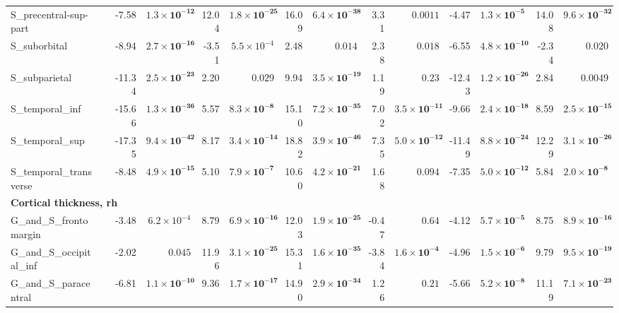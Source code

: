 {\begin{longtable}{llrrrrrrrrrrrr}
S\_precentral-sup-part &  & -7.58 & $\mathbf{1.3{\times}10^{-12}}$ & 12.04 & $\mathbf{1.8{\times}10^{-25}}$ & 16.09 & $\mathbf{6.4{\times}10^{-38}}$ & 3.31 & $0.0011$ & -4.47 & $\mathbf{1.3{\times}10^{-5}}$ & 14.08 & $\mathbf{9.6{\times}10^{-32}}$ \\
S\_suborbital &  & -8.94 & $\mathbf{2.7{\times}10^{-16}}$ & -3.51 & $5.5{\times}10^{-4}$ & 2.48 & $0.014$ & 2.38 & $0.018$ & -6.55 & $\mathbf{4.8{\times}10^{-10}}$ & -2.34 & $0.020$ \\
S\_subparietal &  & -11.34 & $\mathbf{2.5{\times}10^{-23}}$ & 2.20 & $0.029$ & 9.94 & $\mathbf{3.5{\times}10^{-19}}$ & 1.19 & $0.23$ & -12.43 & $\mathbf{1.2{\times}10^{-26}}$ & 2.84 & $0.0049$ \\
S\_temporal\_inf &  & -15.66 & $\mathbf{1.3{\times}10^{-36}}$ & 5.57 & $\mathbf{8.3{\times}10^{-8}}$ & 15.10 & $\mathbf{7.2{\times}10^{-35}}$ & 7.02 & $\mathbf{3.5{\times}10^{-11}}$ & -9.66 & $\mathbf{2.4{\times}10^{-18}}$ & 8.59 & $\mathbf{2.5{\times}10^{-15}}$ \\
S\_temporal\_sup &  & -17.35 & $\mathbf{9.4{\times}10^{-42}}$ & 8.17 & $\mathbf{3.4{\times}10^{-14}}$ & 18.82 & $\mathbf{3.9{\times}10^{-46}}$ & 7.35 & $\mathbf{5.0{\times}10^{-12}}$ & -11.49 & $\mathbf{8.8{\times}10^{-24}}$ & 12.29 & $\mathbf{3.1{\times}10^{-26}}$ \\
S\_temporal\_transverse &  & -8.48 & $\mathbf{4.9{\times}10^{-15}}$ & 5.10 & $\mathbf{7.9{\times}10^{-7}}$ & 10.60 & $\mathbf{4.2{\times}10^{-21}}$ & 1.68 & $0.094$ & -7.35 & $\mathbf{5.0{\times}10^{-12}}$ & 5.84 & $\mathbf{2.0{\times}10^{-8}}$ \\
\midrule\multicolumn{14}{l}{\textbf{Cortical thickness, rh}} \\
G\_and\_S\_frontomargin &  & -3.48 & $6.2{\times}10^{-4}$ & 8.79 & $\mathbf{6.9{\times}10^{-16}}$ & 12.03 & $\mathbf{1.9{\times}10^{-25}}$ & -0.47 & $0.64$ & -4.12 & $\mathbf{5.7{\times}10^{-5}}$ & 8.75 & $\mathbf{8.9{\times}10^{-16}}$ \\
G\_and\_S\_occipital\_inf &  & -2.02 & $0.045$ & 11.96 & $\mathbf{3.1{\times}10^{-25}}$ & 15.31 & $\mathbf{1.6{\times}10^{-35}}$ & -3.84 & $\mathbf{1.6{\times}10^{-4}}$ & -4.96 & $\mathbf{1.5{\times}10^{-6}}$ & 9.79 & $\mathbf{9.5{\times}10^{-19}}$ \\
G\_and\_S\_paracentral &  & -6.81 & $\mathbf{1.1{\times}10^{-10}}$ & 9.36 & $\mathbf{1.7{\times}10^{-17}}$ & 14.90 & $\mathbf{2.9{\times}10^{-34}}$ & 1.26 & $0.21$ & -5.66 & $\mathbf{5.2{\times}10^{-8}}$ & 11.19 & $\mathbf{7.1{\times}10^{-23}}$ \\

\end{longtable}}
